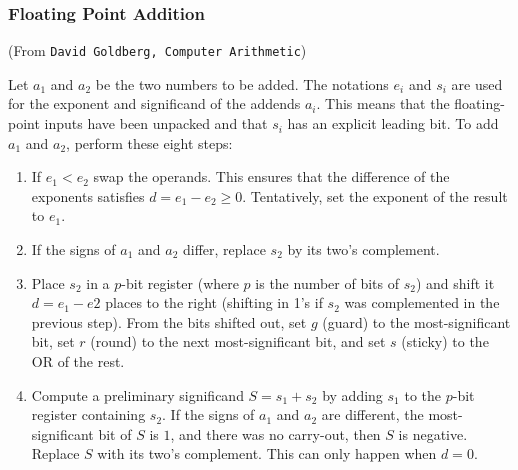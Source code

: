 \documentclass{beamer}
\begin{document}




\begin{frame}%
\frametitle{Floating Point Addition}
\tiny
(From \texttt{David Goldberg, Computer Arithmetic})
\vspace{0.5cm}

\scriptsize

Let $a_1$ and $a_2$ be the two numbers to be added. The notations $e_i$
and $s_i$ are used for the exponent and significand of the addends $a_i$.
This means that the floating-point inputs have been unpacked and that $s_i$
has an explicit leading bit. To add $a_1$ and $a_2$, perform these eight steps:

\begin{enumerate}

\item If $e_1 < e_2$ swap the operands. This ensures that the difference of the exponents
  satisfies $d = e_1 - e_2 \ge 0$. Tentatively, set the exponent of the result to $e_1$.\\

\item If the signs of $a_1$ and $a_2$ differ, replace $s_2$ by its two's complement.\\

\item Place $s_2$ in a $p$-bit register (where $p$ is the number of bits of $s_2$)
  and shift it $d = e_1 - e2$ places to the right (shifting in
1's if $s_2$ was complemented in the previous step). From the bits shifted out, set $g$ (guard)
to the most-significant bit, set $r$ (round) to the next most-significant bit, and set $s$ (sticky) to
the OR of the rest.

\item Compute a preliminary significand $S = s_1 + s_2$ by adding $s_1$ to the $p$-bit register
containing $s_2$. If the signs of $a_1$ and $a_2$ are different, the most-significant bit of $S$
is $1$, and there was no carry-out, then $S$ is negative. Replace $S$ with its two's
complement. This can only happen when $d = 0$.

\end{enumerate}

\end{frame}
\end{document}
